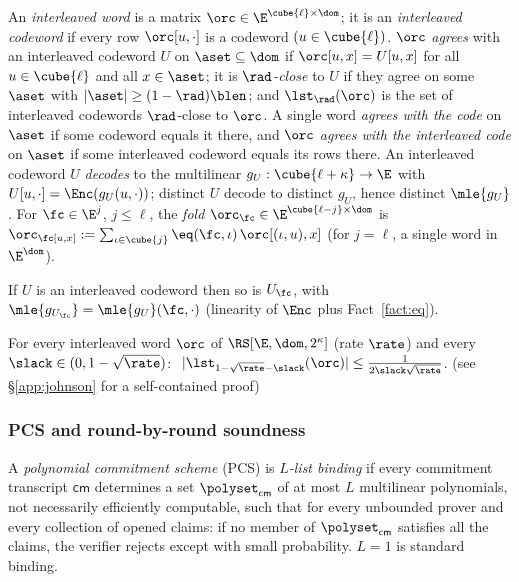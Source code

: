 \begin{definition}\label{def:interleaved}
An \emph{interleaved word} is a matrix $\orc \in \E^{\cube{\ell} \times \dom}$; it is an \emph{interleaved codeword} if every row $\orc[u, \cdot]$ is a codeword $(u \in \cube{\ell})$. $\orc$ \emph{agrees} with an interleaved codeword $U$ on $\aset \subseteq \dom$ if $\orc[u,x] = U[u,x]$ for all $u \in \cube{\ell}$ and all $x \in \aset$; it is \emph{$\rad$-close} to $U$ if they agree on some $\aset$ with $|\aset| \ge (1-\rad)\blen$; and $\lst_\rad(\orc)$ is the set of interleaved codewords $\rad$-close to $\orc$. A single word \emph{agrees with the code} on $\aset$ if some codeword equals it there, and $\orc$ \emph{agrees with the interleaved code} on $\aset$ if some interleaved codeword equals its rows there. An interleaved codeword $U$ \emph{decodes} to the multilinear $g_U : \cube{\ell + \kappa} \to \E$ with $U[u, \cdot] = \Enc(g_U(u, \cdot))$; distinct $U$ decode to distinct $g_U$, hence distinct $\mle{g_U}$. For $\fc \in \E^{j}$, $j \le \ell$, the \emph{fold} $\orc_\fc \in \E^{\cube{\ell - j} \times \dom}$ is $\orc_\fc[u, x] := \sum_{\iota \in \cube{j}} \eq(\fc, \iota)\, \orc[(\iota, u), x]$ (for $j = \ell$, a single word in $\E^{\dom}$).
\end{definition}

\begin{fact}\label{fact:fold-decode}
If $U$ is an interleaved codeword then so is $U_\fc$, with $\mle{g_{U_\fc}} = \mle{g_U}(\fc, \cdot)$ (linearity of $\Enc$ plus Fact~\ref{fact:eq}).
\end{fact}

\begin{theorem}\label{thm:johnson-interleaved}
For every interleaved word $\orc$ of $\RS[\E,\dom,2^\kappa]$ (rate $\rate$) and every $\slack \in (0, 1-\sqrt{\rate})$: $\ |\lst_{1-\sqrt{\rate}-\slack}(\orc)| \le \frac{1}{2\slack\sqrt{\rate}}$. (see \S\ref{app:johnson} for a self-contained proof)
\end{theorem}

\subsubsection{PCS and round-by-round soundness}\label{sec:iopcs}

\begin{definition}\label{def:listbinding}
A \emph{polynomial commitment scheme} (PCS) is \emph{$L$-list binding} if every commitment transcript $\mathsf{cm}$ determines a set $\polyset_{\mathsf{cm}}$ of at most $L$ multilinear polynomials, not necessarily efficiently computable, such that for every unbounded prover and every collection of opened claims: if no member of $\polyset_{\mathsf{cm}}$ satisfies all the claims, the verifier rejects except with small probability. $L = 1$ is standard binding.
\end{definition}


